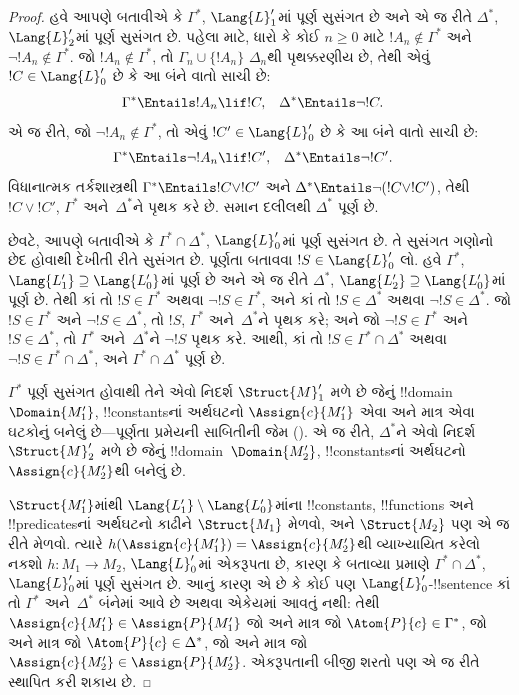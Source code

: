 \documentclass[../../../include/open-logic-section]{subfiles}
\begin{document}
\begin{proof}
હવે આપણે બતાવીએ કે $\Gamma^*$, $\Lang{L}'_1$માં પૂર્ણ સુસંગત છે અને
એ જ રીતે $\Delta^*$, $\Lang{L}'_2$માં પૂર્ણ સુસંગત છે. પહેલા માટે,
ધારો કે કોઈ $n\ge0$ માટે $!A_n\notin\Gamma^*$ અને $\lnot !A_n
\notin\Gamma^*$. જો $!A_n\notin\Gamma^*$, તો $\Gamma_n\cup\{!A_n\}$
$\Delta_n$થી પૃથક્કરણીય છે, તેથી એવું $!C\in\Lang{L}'_0$ છે કે આ
બંને વાતો સાચી છે:
\begin{align*}
  \Gamma^* & \Entails !A_n \lif !C, &
  \Delta^* & \Entails \lnot !C.
\end{align*}
એ જ રીતે, જો $\lnot !A_n\notin\Gamma^*$, તો એવું $!C'\in
\Lang{L}'_0$ છે કે આ બંને વાતો સાચી છે:
\begin{align*}
  \Gamma^* & \Entails \lnot !A_n \lif !C', &
  \Delta^* & \Entails \lnot !C'.
\end{align*}
વિધાનાત્મક તર્કશાસ્ત્રથી $\Gamma^*\Entails !C\lor !C'$ અને
$\Delta^*\Entails\lnot(!C\lor !C')$, તેથી $!C\lor !C'$,
$\Gamma^*$ અને~$\Delta^*$ને પૃથક કરે છે. સમાન દલીલથી $\Delta^*$ પૂર્ણ
છે.

છેવટે, આપણે બતાવીએ કે $\Gamma^*\cap\Delta^*$, $\Lang{L}'_0$માં પૂર્ણ
સુસંગત છે. તે સુસંગત ગણોનો છેદ હોવાથી દેખીતી રીતે સુસંગત છે. પૂર્ણતા
બતાવવા $!S\in\Lang{L}'_0$ લો. હવે $\Gamma^*$, $\Lang{L'_1}
\supseteq\Lang{L'_0}$માં પૂર્ણ છે અને એ જ રીતે $\Delta^*$,
$\Lang{L'_2}\supseteq\Lang{L'_0}$માં પૂર્ણ છે. તેથી કાં તો
$!S\in\Gamma^*$ અથવા $\lnot !S\in\Gamma^*$, અને કાં તો
$!S\in\Delta^*$ અથવા $\lnot !S\in\Delta^*$. જો $!S\in\Gamma^*$ અને
$\lnot !S\in\Delta^*$, તો $!S$, $\Gamma^*$ અને~$\Delta^*$ને પૃથક
કરે; અને જો $\lnot !S\in\Gamma^*$ અને $!S\in\Delta^*$, તો
$\Gamma^*$ અને~$\Delta^*$ને $\lnot !S$ પૃથક કરે. આથી, કાં તો
$!S\in\Gamma^*\cap\Delta^*$
અથવા $\lnot !S\in\Gamma^*\cap\Delta^*$, અને
$\Gamma^*\cap\Delta^*$ પૂર્ણ છે.

$\Gamma^*$ પૂર્ણ સુસંગત હોવાથી તેને એવો નિદર્શ $\Struct{M}'_1$ મળે
છે જેનું !!{domain}~$\Domain{M'_1}$, !!{constant}sનાં અર્થઘટનો
$\Assign{c}{M'_1}$ એવા અને માત્ર એવા ઘટકોનું બનેલું છે---પૂર્ણતા
પ્રમેયની સાબિતીની જેમ (). એ જ
રીતે, $\Delta^*$ને એવો નિદર્શ~$\Struct{M}'_2$ મળે છે જેનું
!!{domain}~$\Domain{M'_2}$, !!{constant}sનાં અર્થઘટનો
$\Assign{c}{M'_2}$થી બનેલું છે.

$\Struct{M'_1}$માંથી $\Lang{L'_1}\setminus\Lang{L'_0}$માંના
!!{constant}s, !!{function}s અને !!{predicate}sનાં અર્થઘટનો કાઢીને
$\Struct{M_1}$ મેળવો, અને $\Struct{M_2}$ પણ એ જ રીતે મેળવો. ત્યારે
$h(\Assign{c}{M'_1})=\Assign{c}{M'_2}$થી વ્યાખ્યાયિત કરેલો નકશો
$h\colon M_1\to M_2$, $\Lang{L}'_0$માં એકરૂપતા છે, કારણ કે બતાવ્યા
પ્રમાણે $\Gamma^*\cap\Delta^*$, $\Lang{L}'_0$માં પૂર્ણ સુસંગત છે.
આનું કારણ એ છે કે કોઈ પણ $\Lang{L}'_0$-!!{sentence} કાં તો $\Gamma^*$
અને~$\Delta^*$ બંનેમાં આવે છે અથવા એકેયમાં આવતું નથી: તેથી
$\Assign{c}{M'_1}\in\Assign{P}{M'_1}$ જો અને માત્ર જો
$\Atom{P}{c}\in\Gamma^*$, જો અને માત્ર જો $\Atom{P}{c}\in\Delta^*$,
જો અને માત્ર જો $\Assign{c}{M'_2}\in\Assign{P}{M'_2}$. એકરૂપતાની
બીજી શરતો પણ એ જ રીતે સ્થાપિત કરી શકાય છે.


\end{proof}
\end{document}
